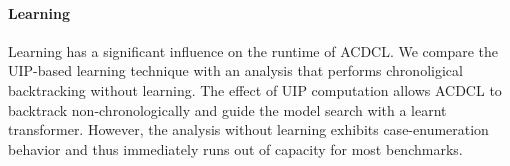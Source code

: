 \paragraph {\textbf{Learning}} Learning has a significant influence on
the runtime of ACDCL.  We compare the UIP-based learning technique with 
an analysis that performs chronoligical backtracking without learning. 
The effect of UIP computation allows ACDCL to backtrack non-chronologically 
and guide the model search with a learnt transformer.  However, the analysis 
without learning  exhibits case-enumeration behavior and thus immediately 
runs out of capacity for most benchmarks. 


